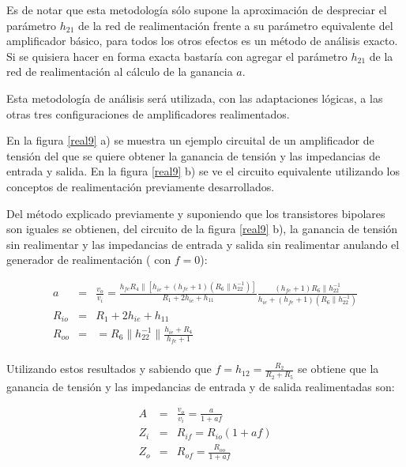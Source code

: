 Es de notar que esta metodología sólo supone la aproximación de
despreciar el parámetro \textbf{$h_{21}$} de la red de
realimentación frente a su parámetro equivalente del amplificador
básico, para todos los otros efectos es un método de análisis
exacto. Si se quisiera hacer en forma exacta bastaría con agregar el
parámetro \textbf{$h_{21}$} de la red de realimentación al cálculo
de la ganancia \textbf{$a$}.

Esta metodología de análisis será utilizada, con las adaptaciones
lógicas, a las otras tres configuraciones de amplificadores
realimentados.

En la figura \ref{real9} a) se muestra un ejemplo circuital de un
amplificador de tensión del que se quiere obtener la ganancia de
tensión y las impedancias de entrada y salida. En la figura
\ref{real9} b) se ve el circuito equivalente utilizando los
conceptos de realimentación previamente desarrollados.

Del método explicado previamente y suponiendo que los transistores
bipolares son iguales se obtienen, del circuito de la figura
\ref{real9} b), la ganancia de tensión sin realimentar  y las
impedancias de entrada y salida sin realimentar anulando el
generador de realimentación ( con $f=0$):

\begin{eqnarray*}
	a &=& \frac{v_o}{v_i}=\frac{\displaystyle h_{fe}R_4\parallel [h_{ie}+(h_{fe}+1)(R_6\parallel h_{22}^{-1})]}{\displaystyle R_1+2h_{ie}+h_{11}}\frac{\displaystyle (h_{fe}+1)R_6\parallel h_{22}^{-1}}{\displaystyle h_{ie}+(h_{fe}+1)(R_6\parallel h_{22}^{-1})}\\
	R_{io} &=& R_1+2h_{ie}+h_{11}\\
	R_{oo} &=& = R_6\parallel h_{22}^{-1}\parallel \frac{\displaystyle h_{ie}+R_4}{\displaystyle h_{fe}+1}\\
\end{eqnarray*}

Utilizando estos resultados y sabiendo que
$f=h_{12}=\frac{\displaystyle R_2}{\displaystyle R_2+R_5}$ se
obtiene que la ganancia de tensión y las impedancias de entrada y de
salida realimentadas son:

\begin{eqnarray*}
	A &=& \frac{\displaystyle v_o}{\displaystyle v_i}=\frac{\displaystyle a}{\displaystyle 1+af}\\
	Z_i &=& R_{if} = R_{io}(1+af)\\
	Z_o &=& R_{of} = \frac{\displaystyle R_{oo}}{\displaystyle 1+af}\\
\end{eqnarray*}



